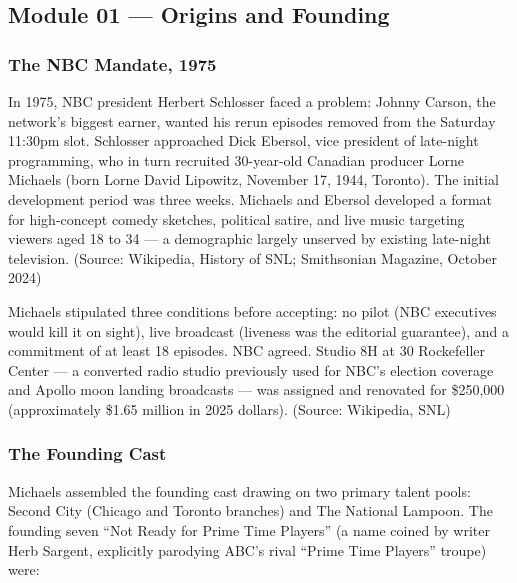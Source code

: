\documentclass[11pt,letterpaper]{article}
\begin{document}
\subsection{Module 01 --- Origins and Founding}

\subsubsection{The NBC Mandate, 1975}

In 1975, NBC president Herbert Schlosser faced a problem: Johnny Carson, the network's biggest earner, wanted his rerun episodes removed from the Saturday 11:30pm slot. Schlosser approached Dick Ebersol, vice president of late-night programming, who in turn recruited 30-year-old Canadian producer Lorne Michaels (born Lorne David Lipowitz, November 17, 1944, Toronto). The initial development period was three weeks. Michaels and Ebersol developed a format for high-concept comedy sketches, political satire, and live music targeting viewers aged 18 to 34 --- a demographic largely unserved by existing late-night television. (Source: Wikipedia, History of SNL; Smithsonian Magazine, October 2024)

Michaels stipulated three conditions before accepting: no pilot (NBC executives would kill it on sight), live broadcast (liveness was the editorial guarantee), and a commitment of at least 18 episodes. NBC agreed. Studio 8H at 30 Rockefeller Center --- a converted radio studio previously used for NBC's election coverage and Apollo moon landing broadcasts --- was assigned and renovated for \$250,000 (approximately \$1.65 million in 2025 dollars). (Source: Wikipedia, SNL)

\subsubsection{The Founding Cast}

Michaels assembled the founding cast drawing on two primary talent pools: Second City (Chicago and Toronto branches) and The National Lampoon. The founding seven ``Not Ready for Prime Time Players'' (a name coined by writer Herb Sargent, explicitly parodying ABC's rival ``Prime Time Players'' troupe) were:
\end{document}
